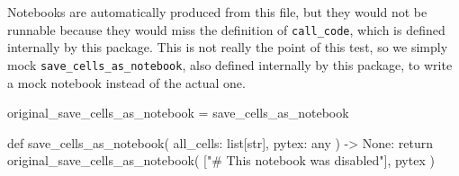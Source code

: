 \documentclass[oneside]{book}
\begin{document}
Notebooks are automatically produced from this file, but they would not be runnable because they would miss the definition of \texttt{call\_code}, which is defined internally by this package. This is not really the point of this test, so we simply mock \texttt{save\_cells\_as\_notebook}, also defined internally by this package, to write a mock notebook instead of the actual one.

\begin{pycell}
original_save_cells_as_notebook = save_cells_as_notebook

def save_cells_as_notebook(
    all_cells: list[str], pytex: any
) -> None:
    return original_save_cells_as_notebook(
        ["\n# This notebook was disabled"], pytex
    )
\end{pycell}
\end{document}
